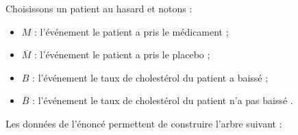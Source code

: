 \begin{corrige}
     \par
     Choisissons un patient au hasard et notons :
     \par
     \begin{itemize}
          \item
          $M$ : l'événement \og le patient a pris le médicament \fg{} ;
          \item
          $\overline{M}$ : l'événement \og le patient a pris le placebo \fg{} ;
          \item
          $B$ : l'événement \og le taux de cholestérol du patient a baissé \fg{} ;
          \item
          $\overline{B}$ : l'événement \og le taux de cholestérol du patient n'a pas baissé \fg{}.
          \par
     \end{itemize}
     \par
     Les données de l'énoncé permettent de construire l'arbre suivant :
     \par
     \begin{center}
          \begin{extern}%
\end{extern}
\end{center}
\end{corrige}
